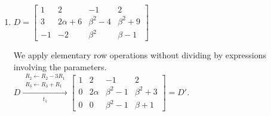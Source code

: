 \begin{enumerate}[label=\alph*)]
\begin{answer}
        Thus,

        $$
        \operatorname{rank}(C)=2
        \quad\text{if }\alpha=0.
        $$

        \textbf{Case 2: $\alpha\neq0$.}

        Since $\alpha\neq0$, the following
        elementary row operation is valid:

        $$
        R_3\leftarrow
        R_3-\frac{1-2\alpha}{\alpha}R_2.
        $$

        Consequently,

        $$
        C\sim
        \begin{bmatrix}
            -1 & 1 & 3 \\
             0 & \alpha & -\alpha \\
             0 & 0 & 3-2\alpha
        \end{bmatrix}.
        $$

        The third pivot vanishes if and only if

        $$
        3-2\alpha=0
        \iff \alpha=\frac{3}{2}.
        $$

        Therefore,

        $$
        \boxed{
        \operatorname{rank}(C)=
        \begin{cases}
            2, & \alpha\in\left\{0,\frac{3}{2}\right\},\\[0.4em]
            3, & \alpha\notin\left\{0,\frac{3}{2}\right\}.
        \end{cases}
        }
        $$
    \end{answer}


    \item
    $D=
    \begin{bmatrix}
         1 & 2 & -1 & 2 \\
         3 & 2\alpha+6 & \beta^2-4 & \beta^2+9 \\
        -1 & -2 & \beta^2 & \beta-1
    \end{bmatrix}
    $ \\[1.0em]

    \begin{answer}
        We apply elementary row operations
        without dividing by expressions
        involving the parameters. \\[0.5em]

        $D \xrightarrow[t_1]{
            \substack{
                R_2\leftarrow R_2-3R_1 \\
                R_3\leftarrow R_3+R_1
            }
        }
        \begin{bmatrix}
            1 & 2 & -1 & 2 \\
            0 & 2\alpha & \beta^2-1 & \beta^2+3 \\
            0 & 0 & \beta^2-1 & \beta+1
        \end{bmatrix}
        =D'.
        $ \\[1.0em]


\end{answer}
\end{enumerate}
